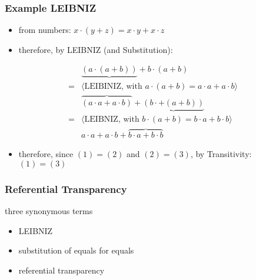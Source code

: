 \begin{multicols}{2}
\subsubsection{Example LEIBNIZ}
\begin{itemize}
  \item from numbers: $x \cdot (y + z) = x \cdot y + x \cdot z$
  \item therefore, by LEIBNIZ (and Substitution):
\end{itemize}
\begin{align}
  &\underbrace{(a \cdot (a + b))} + b \cdot (a + b)\\
  =& \langle \text{LEIBINIZ, with } a \cdot (a + b) = a \cdot a + a \cdot b \rangle \nonumber\\
  &\overbrace{(a \cdot a + a \cdot b)} + \underbrace{(b \cdot + (a + b))}\\
  =& \langle \text{LEIBNIZ, with } b \cdot (a + b) = b \cdot a + b \cdot b \rangle \nonumber\\
  & a \cdot a + a \cdot b + \overbrace{b \cdot a + b \cdot b}
\end{align}
\begin{itemize}
  \item therefore, since $(1) = (2)$ and $(2) = (3)$, by Transitivity: $(1) = (3)$ 
\end{itemize}

\subsubsection{Referential Transparency}
three synonymous terms
\begin{itemize}
  \item LEIBNIZ
  \item substitution of equals for equals
  \item referential transparency
\end{itemize}


\end{multicols}
